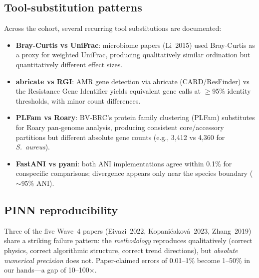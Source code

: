 \subsection{Tool-substitution patterns}
Across the cohort, several recurring tool substitutions are documented:
\begin{itemize}[leftmargin=1.4em,itemsep=0.2em,topsep=0.2em]
\item \textbf{Bray-Curtis vs UniFrac}: microbiome papers (Li~2015) used
  Bray-Curtis as a proxy for weighted UniFrac, producing qualitatively
  similar ordination but quantitatively different effect sizes.
\item \textbf{abricate vs RGI}: AMR gene detection via abricate (CARD/ResFinder)
  vs the Resistance Gene Identifier yields equivalent gene calls at $\geq$95\%
  identity thresholds, with minor count differences.
\item \textbf{PLFam vs Roary}: BV-BRC's protein family clustering (PLFam)
  substitutes for Roary pan-genome analysis, producing consistent
  core/accessory partitions but different absolute gene counts (e.g., 3,412
  vs 4,360 for \textit{S.\ aureus}).
\item \textbf{FastANI vs pyani}: both ANI implementations agree within 0.1\%
  for conspecific comparisons; divergence appears only near the species
  boundary ($\sim$95\% ANI).
\end{itemize}

\subsection{PINN reproducibility}\label{sec:pinn-repro}

Three of the five Wave~4 papers (Eivazi~2022, Kopani\'cakov\'a~2023,
Zhang~2019) share a striking failure pattern: the \emph{methodology}
reproduces qualitatively (correct physics, correct algorithmic structure,
correct trend directions), but \emph{absolute numerical precision} does not.
Paper-claimed errors of 0.01--1\% become 1--50\% in our hands---a gap of
10--100$\times$.

